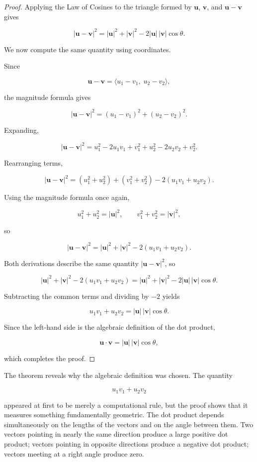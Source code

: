 \begin{proof}
Applying the Law of Cosines to the triangle formed by
$\mathbf{u}$, $\mathbf{v}$, and $\mathbf{u}-\mathbf{v}$ gives

\[
|\mathbf{u}-\mathbf{v}|^2
=
|\mathbf{u}|^2
+
|\mathbf{v}|^2
-
2|\mathbf{u}|\,|\mathbf{v}|\cos\theta.
\]

We now compute the same quantity using coordinates.

Since

\[
\mathbf{u}-\mathbf{v}
=
\langle u_1-v_1,\;u_2-v_2\rangle,
\]

the magnitude formula gives

\[
|\mathbf{u}-\mathbf{v}|^2
=
(u_1-v_1)^2+(u_2-v_2)^2.
\]

Expanding,

\[
|\mathbf{u}-\mathbf{v}|^2
=
u_1^2-2u_1v_1+v_1^2
+
u_2^2-2u_2v_2+v_2^2.
\]

Rearranging terms,

\[
|\mathbf{u}-\mathbf{v}|^2
=
(u_1^2+u_2^2)
+
(v_1^2+v_2^2)
-
2(u_1v_1+u_2v_2).
\]

Using the magnitude formula once again,

\[
u_1^2+u_2^2
=
|\mathbf{u}|^2,
\qquad
v_1^2+v_2^2
=
|\mathbf{v}|^2,
\]

so

\[
|\mathbf{u}-\mathbf{v}|^2
=
|\mathbf{u}|^2
+
|\mathbf{v}|^2
-
2(u_1v_1+u_2v_2).
\]

Both derivations describe the same quantity
$|\mathbf{u}-\mathbf{v}|^2$, so

\[
|\mathbf{u}|^2
+
|\mathbf{v}|^2
-
2(u_1v_1+u_2v_2)
=
|\mathbf{u}|^2
+
|\mathbf{v}|^2
-
2|\mathbf{u}|\,|\mathbf{v}|\cos\theta.
\]

Subtracting the common terms and dividing by $-2$ yields

\[
u_1v_1+u_2v_2
=
|\mathbf{u}|\,|\mathbf{v}|\cos\theta.
\]

Since the left-hand side is the algebraic definition of the dot product,

\[
\mathbf{u}\cdot\mathbf{v}
=
|\mathbf{u}|\,|\mathbf{v}|\cos\theta,
\]

which completes the proof.
\end{proof}

The theorem reveals why the algebraic definition was chosen. The quantity

\[
u_1v_1+u_2v_2
\]

appeared at first to be merely a computational rule, but the proof shows
that it measures something fundamentally geometric. The dot product
depends simultaneously on the lengths of the vectors and on the angle
between them. Two vectors pointing in nearly the same direction produce a
large positive dot product; vectors pointing in opposite directions
produce a negative dot product; vectors meeting at a right angle produce
zero.

